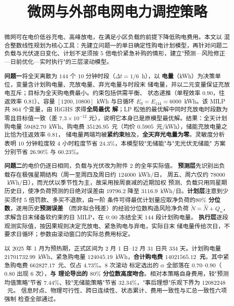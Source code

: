 \documentclass[withoutpreface,bwprint]{cumcmthesis}
\title{微网与外部电网电力调控策略}
\begin{document}
\maketitle

\begin{abstract}

微网可在电价低谷充电、高峰放电，在满足小区负载的前提下降低购电费用。本文以
混合整数线性规划为核心工具：先建立问题一的单日确定性购电计划模型，再针对问题二
负载与光伏逐日变化、计划不足须按 $5$ 倍电价紧急补购的情形，建立"预测—风险修正
—日前优化—实时执行"的三层滚动模型。

\textbf{问题一}将全天离散为 $144$ 个 $10$ 分钟时段（$\Delta t = 1/6$~h），以
\textbf{电量}（kWh）为决策单位，变量含计划购电量、充放电量、弃光电量与时段末
储电量，并以二元变量保证充放电互斥；目标为全天购电费最小。约束包括供需平衡、
状态递推（单程效率 $0.90$，往返效率 $0.81$）、容量 $[1200,10800]$~kWh 与日循环
$E_0=E_{144}=6000$~kWh。该 MILP 共 $864$ 个变量，由 HiGHS 求得\textbf{全局最优
解}；LP 松弛的最优解中同时充放电时段数为零且目标值一致（差 $7.3\times10^{-12}$
元），说明它本身已是原模型最优解。结果：全天计划购电量 $59482.70$~kWh、购电费
$35126.95$~元（均价 $0.5905$~元/kWh），储能充放电量之比恰为往返效率 $0.81$，
储电量两端均被\textbf{紧约束}触及，\textbf{全天弃光电量为零}。灵敏度分析表明
$10$ 分钟粒度较 $4$ 小时粒度节省 $24.3\%$，本模型较"无储能"与"无光伏无储能"
方案分别节省 $26.90\%$ 与 $60.23\%$。

\textbf{问题二}的电价仍逐日相同，负载与光伏改为附件 2 的全年实际值。
\textbf{预测层}先识别出负载存在极强星期结构（周一至周四及周日约 $124000$~kWh/日，
周五、周六仅约 $78000$~kWh/日），而光伏以季节性为主，故采用按周衰减的近期加权
预测、负载只用同星期历史日，使净负荷预测的日绝对误差由 $19796.2$ 降至
$3116.9$~kWh/日。\textbf{计划层}注意到少买须付 $5$ 倍罚款、多买不退款，由一阶
条件可得最优计划量应取净负荷的\textbf{$80\%$ 分位数}，遂用历史\textbf{预测误差}
（而非拟合残差）的经验分位数构造风险净负荷 $\widetilde N=\widehat N+Q_{\alpha}$，
求解含日末储备软约束的日 MILP，在 $0{:}00$ 冻结全天 $144$ 段计划购电量。
\textbf{执行层}逐段观测实际值，按因果规则决定充放电、紧急购电与弃电，实际日末
储电量传给次日，不要求日循环；参数由滚动窗口的实际总费用标定。

以 2025 年 1 月为预热期，正式区间为 2 月 1 日--12 月 31 日共 $334$ 天。计划购电量
$21701732.99$~kWh、紧急购电量 $124045.19$~kWh，\textbf{合计购电费
$14021565.12$~元}，其中紧急购电费 $662827.17$~元、仅占 $4.73\%$。$8$ 次滚动
标定选出的 $\alpha$ 全部落在 $0.70$--$0.90$（$0.80$ 出现 $6$ 次），\textbf{与
理论导出的 $80\%$ 分位数高度吻合}。相对本策略自身费用，较"预测均值策略"节省
$7.44\%$、较"无储能策略"节省 $32.34\%$，"事后理想"乐观下界为 $12082248$~元。
信息时点、物理可行性、跨日连续性、状态累计、费用一致性与汇总一致性六项强制
检查全部通过。

\end{abstract}
\end{document}

